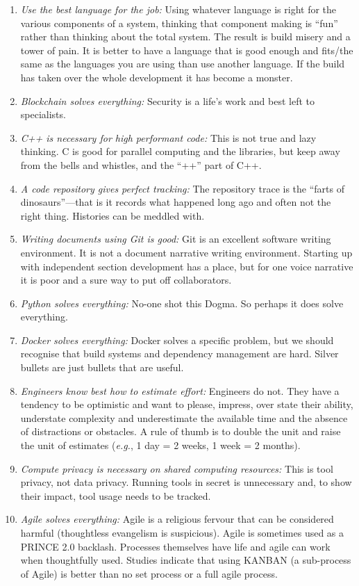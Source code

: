\documentclass[a4paper,UKenglish]{dagrep}
\newcommand{\eg}{\emph{e.g.},\xspace}
\begin{document}
\begin{enumerate}
\item \emph{Use the best language for the job:} Using whatever language is right for the various components of a system, thinking that component making is ``fun'' rather than thinking about the total system. The result is build misery and a tower of pain. It is better to have a language that is good enough and fits/the same as the languages you are using than use another language. If the build has taken over the whole development it has become a monster.
\item \emph{Blockchain solves everything:} Security is a life's work and best left to specialists.
\item \emph{C++ is necessary for high performant code:} This is not true and lazy thinking. C is good for parallel computing and the libraries, but keep away from the bells and whistles, and the ``++'' part of C++.
\item \emph{A code repository gives perfect tracking:} The repository trace is the ``farts of dinosaurs''---that is it records what happened long ago and often not the right thing. Histories can be meddled with.
\item \emph{Writing documents using Git is good:} Git is an excellent software writing environment. It is not a document narrative writing environment. Starting up with independent section development has a place, but for one voice narrative it is poor and a sure way to put off collaborators.
\item \emph{Python solves everything:} No-one shot this Dogma. So perhaps it does solve everything.
\item \emph{Docker solves everything:} Docker solves a specific problem, but we should recognise that build systems and dependency management are hard. Silver bullets are just bullets that are useful.
\item \emph{Engineers know best how to estimate effort:} Engineers do not. They have a tendency to be optimistic and want to please, impress, over state their ability, understate complexity and underestimate the available time and the absence of distractions or obstacles. A rule of thumb is to double the unit and raise the unit of estimates (\eg 1 day = 2 weeks, 1 week = 2 months).
\item \emph{Compute privacy is necessary on shared computing resources:} This is tool privacy, not data privacy. Running tools in secret is unnecessary and, to show their impact, tool usage needs to be tracked.
\item \emph{Agile solves everything:} Agile is a religious fervour that can be considered harmful (thoughtless evangelism is suspicious). Agile is sometimes used as a PRINCE 2.0 backlash. Processes themselves have life and agile can work when thoughtfully used. Studies indicate that using KANBAN (a sub-process of Agile) is better than no set process or a full agile process.
\end{enumerate}
\end{document}
